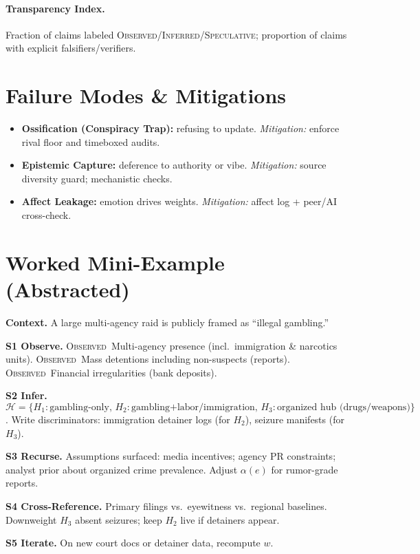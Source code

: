 \documentclass[11pt]{article}
\newcommand{\Obs}{\textsc{Observed}}
\newcommand{\Inf}{\textsc{Inferred}}
\newcommand{\Spec}{\textsc{Speculative}}
\newcommand{\Hset}{\mathcal{H}}
\begin{document}
\paragraph{Transparency Index.} Fraction of claims labeled \Obs/\Inf/\Spec; proportion of claims with explicit falsifiers/verifiers.

\section{Failure Modes \& Mitigations}
\begin{itemize}
  \item \textbf{Ossification (Conspiracy Trap):} refusing to update. \emph{Mitigation:} enforce rival floor and timeboxed audits.
  \item \textbf{Epistemic Capture:} deference to authority or vibe. \emph{Mitigation:} source diversity guard; mechanistic checks.
  \item \textbf{Affect Leakage:} emotion drives weights. \emph{Mitigation:} affect log + peer/AI cross-check.
\end{itemize}

\section{Worked Mini-Example (Abstracted)}
\textbf{Context.} A large multi-agency raid is publicly framed as ``illegal gambling.''

\smallskip
\noindent\textbf{S1 Observe.} 
\Obs\ Multi-agency presence (incl.\ immigration \& narcotics units). 
\Obs\ Mass detentions including non-suspects (reports). 
\Obs\ Financial irregularities (bank deposits).

\smallskip
\noindent\textbf{S2 Infer.} 
$\Hset=\{H_1:\text{gambling-only},\, H_2:\text{gambling+labor/immigration},\, H_3:\text{organized hub (drugs/weapons)}\}$.
Write discriminators: immigration detainer logs (for $H_2$), seizure manifests (for $H_3$).

\smallskip
\noindent\textbf{S3 Recurse.}
Assumptions surfaced: media incentives; agency PR constraints; analyst prior about organized crime prevalence. Adjust $\alpha(e)$ for rumor-grade reports.

\smallskip
\noindent\textbf{S4 Cross-Reference.}
Primary filings vs.\ eyewitness vs.\ regional baselines. Downweight $H_3$ absent seizures; keep $H_2$ live if detainers appear.

\smallskip
\noindent\textbf{S5 Iterate.}
On new court docs or detainer data, recompute $w$.
\end{document}
